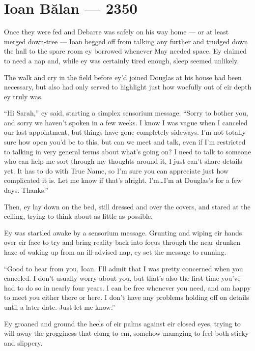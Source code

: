 \hypertarget{ioan-bux103lan-2350}{%
\chapter{Ioan Bălan — 2350}\label{ioan-bux103lan-2350}}

Once they were fed and Debarre was safely on his way home — or at least merged down-tree — Ioan begged off from talking any further and trudged down the hall to the spare room ey borrowed whenever May needed space. Ey claimed to need a nap and, while ey was certainly tired enough, sleep seemed unlikely.

The walk and cry in the field before ey'd joined Douglas at his house had been necessary, but also had only served to highlight just how woefully out of eir depth ey truly was.

``Hi Sarah,'' ey said, starting a simplex sensorium message. ``Sorry to bother you, and sorry we haven't spoken in a few weeks. I know I was vague when I canceled our last appointment, but things have gone completely sideways. I'm not totally sure how open you'd be to this, but can we meet and talk, even if I'm restricted to talking in very general terms about what's going on? I need to talk to someone who can help me sort through my thoughts around it, I just can't share details yet. It has to do with True Name, so I'm sure you can appreciate just how complicated it is. Let me know if that's alright. I'm\ldots I'm at Douglas's for a few days. Thanks.''

Then, ey lay down on the bed, still dressed and over the covers, and stared at the ceiling, trying to think about as little as possible.

Ey was startled awake by a sensorium message. Grunting and wiping eir hands over eir face to try and bring reality back into focus through the near drunken haze of waking up from an ill-advised nap, ey set the message to running.

``Good to hear from you, Ioan. I'll admit that I was pretty concerned when you canceled. I don't usually worry about you, but that's also the first time you've had to do so in nearly four years. I can be free whenever you need, and am happy to meet you either there or here. I don't have any problems holding off on details until a later date. Just let me know.''

Ey groaned and ground the heels of eir palms against eir closed eyes, trying to will away the grogginess that clung to em, somehow managing to feel both sticky and slippery.

